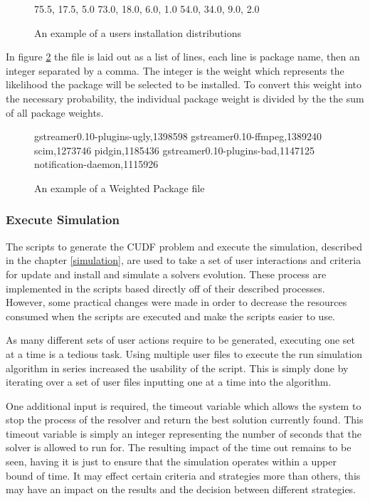 \begin{figure}[htp]
\begin{center}
75.5, 17.5, 5.0
73.0, 18.0, 6.0, 1.0
54.0, 34.0, 9.0, 2.0
\caption[Install Distribution Example File]{An example of a users installation distributions}
\label{userprob}
\end{center}
\end{figure}

In figure \ref{packageprob} the file is laid out as a list of lines, each line is package name, then an integer separated by a comma.
The integer is the weight which represents the likelihood the package will be selected to be installed.
To convert this weight into the necessary probability, the individual package weight is divided by the the sum of all package weights. 

\begin{figure}[htp]
\begin{center}
gstreamer0.10-plugins-ugly,1398598
gstreamer0.10-ffmpeg,1389240
scim,1273746
pidgin,1185436
gstreamer0.10-plugins-bad,1147125
notification-daemon,1115926
\caption[Weighted Package File Example]{An example of a Weighted Package file }
\label{packageprob}
\end{center}
\end{figure}

\subsubsection{Execute Simulation}
The scripts to generate the CUDF problem and execute the simulation, described in the chapter \ref{simulation}, 
are used to take a set of user interactions and criteria for update and install and simulate a solvers evolution.
These process are implemented in the scripts based directly off of their described processes. 
However, some practical changes were made in order to decrease the resources consumed when the scripts are executed and make the scripts easier to use.

As many different sets of user actions require to be generated, executing one set at a time is a tedious task.
Using multiple user files to execute the run simulation algorithm in series increased the usability of the script.
This is simply done by iterating over a set of user files inputting one at a time into the algorithm. 

One additional input is required, the timeout variable which allows the system to stop the process of the resolver and return the best solution currently found.
This timeout variable is simply an integer representing the number of seconds that the solver is allowed to run for.
The resulting impact of the time out remains to be seen, having it is just to ensure that the simulation operates within a upper bound of time.
It may effect certain criteria and strategies more than others, this may have an impact on the results and the decision between different strategies.

